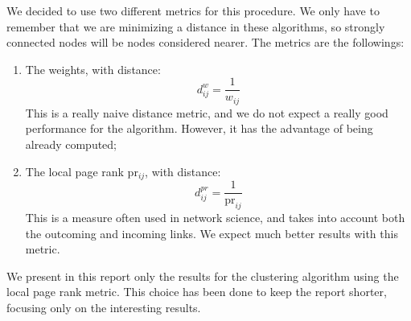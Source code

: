 We decided to use two different metrics for this procedure. We only have to remember that 
we are minimizing a distance in these algorithms, so strongly connected nodes will be 
nodes considered nearer. The metrics are the followings:
\begin{enumerate}
    \item The weights, with distance:
        $$d^{w}_{ij}=\frac{1}{w_{ij}}$$
        This is a really naive distance metric, and we do not expect a really good performance
        for the algorithm. However, it has the advantage of being already computed;
    \item The local page rank pr$_{ij}$, with distance:
        $$d^{pr}_{ij}=\frac{1}{\mbox{pr}_{ij}}$$
        This is a measure often used in network science, and takes into account both the outcoming
        and incoming links. We expect much better results with this metric.
\end{enumerate}

We present in this report only the results for the clustering algorithm using the local page rank
metric. This choice has been done to keep the report shorter, focusing only on the interesting
results.

